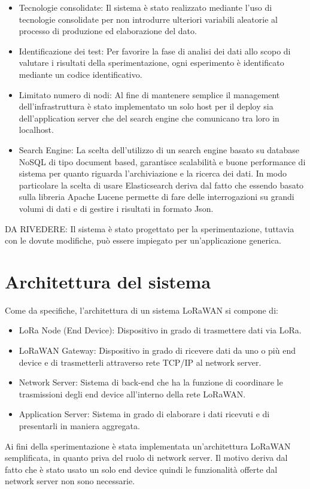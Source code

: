\documentclass[12pt,a4paper,openright,twoside]{report}
\begin{document}
\begin{itemize}
\item Tecnologie consolidate: Il sistema \`e stato realizzato mediante l'uso di tecnologie consolidate per non introdurre ulteriori variabili aleatorie al processo di produzione ed elaborazione del dato. 
\item Identificazione dei test: Per favorire la fase di analisi dei dati allo scopo di valutare i risultati della sperimentazione, ogni esperimento \`e identificato mediante un codice identificativo. 
\item Limitato numero di nodi: Al fine di mantenere semplice il management dell'infrastruttura \`e stato implementato un solo host per il deploy sia dell'application server che del search engine che comunicano tra loro in localhost.   
\item Search Engine: La scelta dell'utilizzo di un search engine basato su database NoSQL di tipo document based, garantisce scalabilità e buone performance di sistema per quanto riguarda l'archiviazione e la ricerca dei dati. In modo particolare la scelta di usare Elasticsearch deriva dal fatto che essendo basato sulla libreria Apache Lucene permette di fare delle interrogazioni su grandi volumi di dati e di gestire i risultati in formato Json.
\end{itemize}
DA RIVEDERE: Il sistema \`e stato progettato per la sperimentazione, tuttavia con le dovute modifiche,  pu\`o essere impiegato per un'applicazione generica.   



 \section{Architettura del sistema}
Come da specifiche, l'architettura di un sistema LoRaWAN si compone di: 
\begin{itemize}                       
\item LoRa Node (End Device): Dispositivo in grado di trasmettere dati via LoRa.
\item LoRaWAN Gateway: Dispositivo in grado di ricevere dati da uno o pi\`u end device e di trasmetterli attraverso rete TCP/IP al network server.
\item Network Server: Sistema di back-end che ha la funzione di coordinare le trasmissioni degli end device all'interno della rete LoRaWAN.
\item Application Server: Sistema in grado di elaborare i dati ricevuti e di presentarli in maniera aggregata.
\end{itemize}
Ai fini della sperimentazione \`e stata implementata un'architettura LoRaWAN semplificata, in quanto priva del ruolo di network server. Il motivo deriva dal fatto che \`e stato usato un solo end device quindi le funzionalit\`a offerte dal network server non sono necessarie.  
\end{document}
